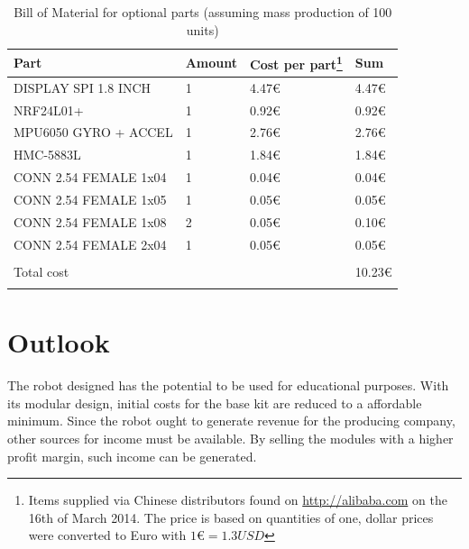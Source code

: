 \documentclass[11pt,a4paper]{article}
\begin{document}
\begin{longtable}{p{}p{}p{}p{}}
\toprule
Part & Amount & Cost per part\footnote{Items supplied via Chinese distributors found on \url{http://alibaba.com} on the 16th of March 2014. The price is based on quantities of one, dollar prices were converted to Euro with $1\euro = 1.3USD$ } & Sum \\
\midrule
DISPLAY SPI 1.8 INCH & 1 & 4.47\euro & 4.47\euro \\
NRF24L01+ & 1 & 0.92\euro & 0.92\euro \\
MPU6050 GYRO + ACCEL & 1 & 2.76\euro & 2.76\euro \\
HMC-5883L & 1 & 1.84\euro & 1.84\euro \\
CONN 2.54 FEMALE 1x04 & 1 & 0.04\euro & 0.04\euro \\
CONN 2.54 FEMALE 1x05 & 1 & 0.05\euro & 0.05\euro \\
CONN 2.54 FEMALE 1x08 & 2 & 0.05\euro & 0.10\euro \\
CONN 2.54 FEMALE 2x04 & 1 & 0.05\euro & 0.05\euro \\
\hline \\
Total cost& & & 10.23\euro \\
\bottomrule
\caption{Bill of Material for optional parts (assuming mass production of 100 units)}
\label{tbl:bom}
\end{longtable}

\section{Outlook}
The robot designed has the potential to be used for educational purposes. With its modular design, initial costs for the base kit are reduced to a affordable minimum. Since the robot ought to generate revenue for the producing company, other sources for income must be available. By selling the modules with a higher profit margin, such income can be generated.



\nocite{*}
\printbibliography
{}
\end{document}
